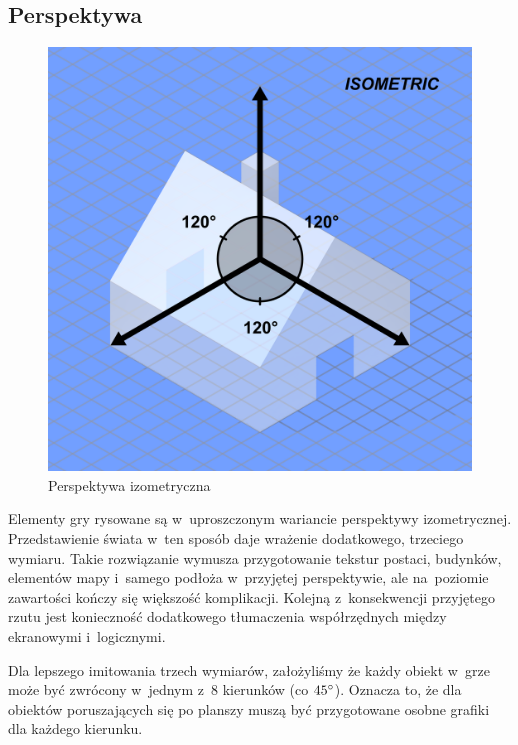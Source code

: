 \documentclass[licencjacka]{pracamgr}
\begin{document}
    \subsection{Perspektywa}
      \begin{figure}[htbp]
	\centering
	\includegraphics[scale=0.25]{izo.png}
	\caption{Perspektywa izometryczna\protect\footnotemark}
      \end{figure}

      Elementy gry rysowane są w~uproszczonym wariancie perspektywy izometrycznej.
      Przedstawienie świata w~ten sposób daje wrażenie dodatkowego, trzeciego wymiaru. Takie rozwiązanie wymusza przygotowanie tekstur
      postaci, budynków, elementów mapy i~samego podłoża w~przyjętej perspektywie, ale na~poziomie
      zawartości kończy się większość komplikacji. Kolejną z~konsekwencji przyjętego rzutu jest konieczność dodatkowego tłumaczenia
      współrzędnych między ekranowymi i~logicznymi.

      Dla lepszego imitowania trzech wymiarów, założyliśmy że każdy obiekt w~grze może być zwrócony w~jednym z~8 kierunków
      (co $45\degree$). Oznacza to, że dla obiektów poruszających się po planszy muszą być przygotowane osobne grafiki dla każdego kierunku.
\end{document}
